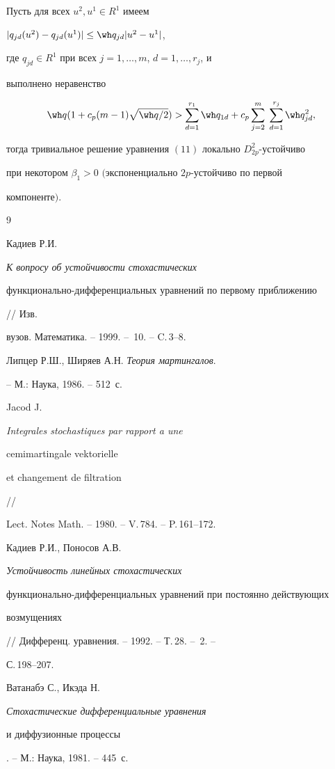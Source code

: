 \begin{thm} 


Пусть для всех $u^2,u^1\in R^1$ имеем 


$|q_{j d}(u^2)-q_{j d}(u^1)|\le\wh q_{j d}|u^2-u^1|$, 


где $q_{j d}\in R^1$ при всех $j=1,\dotsc,m$, $d=1,\dotsc,r_j$, и 


выполнено неравенство 


$$ 


{\wh q}(1+c_p(m-1)\sqrt{\wh q/2})>


\sum^{r_1}_{d=1}\wh q_{1d}+c_p\sum^m_{j=2}\; 


\sum^{r_j}_{d=1}\wh q^2_{j d},


$$ 


тогда тривиальное решение уравнения $(11)$ локально $D^2_{2p}$-устойчиво 


при некотором $\beta_1>0$ $($экспоненциально $2p$-устойчиво по первой 


компоненте$)$. 


\end{thm} 


 


\begin{thebibliography}{9} 


 




Кадиев Р.И. {\em К вопросу об устойчивости стохастических 


функционально-дифференциальных уравнений по первому приближению} // Изв. 


вузов. Математика. -- 1999. -- \No\,10. -- C.\,3--8. 




Липцер Р.Ш., Ширяев А.Н. {\em Теория мартингалов}. 


-- М.: Наука, 1986. -- 512~с. 




Jacod J. {\em Integrales stochastiques par rapport a une 


cemimartingale vektorielle 


et changement de filtration} // 


Lect. Notes Math. -- 1980. -- V.\,784. -- P.\,161--172. 




Кадиев Р.И., Поносов А.В. {\em Устойчивость линейных стохастических 


функционально-дифференциальных уравнений при постоянно действующих 


возмущениях} // Дифференц. уравнения. -- 1992. -- Т.\,28. -- \No\,2. -- 


С.\,198--207. 




Ватанабэ С., Икэда Н. {\em Стохастические дифференциальные уравнения 


и диффузионные процессы}. -- М.: Наука, 1981. -- 445~с. 


 


\end{thebibliography} 


